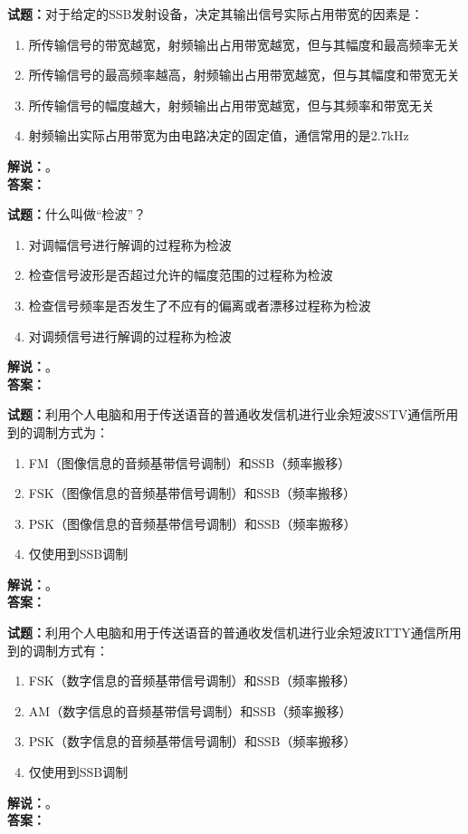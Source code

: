 \documentclass{ctexbook}
\begin{document}
\bigskip

\noindent\textbf{试题：}对于给定的SSB发射设备，决定其输出信号实际占用带宽的因素是：
\begin{enumerate}[leftmargin=3em]
  \item 所传输信号的带宽越宽，射频输出占用带宽越宽，但与其幅度和最高频率无关
  \item 所传输信号的最高频率越高，射频输出占用带宽越宽，但与其幅度和带宽无关
  \item 所传输信号的幅度越大，射频输出占用带宽越宽，但与其频率和带宽无关
  \item 射频输出实际占用带宽为由电路决定的固定值，通信常用的是2.7\unit{\kHz}
\end{enumerate}
\noindent\textbf{解说：}\textbf{}。\\\noindent\textbf{答案：}

\bigskip

\noindent\textbf{试题：}什么叫做“检波”？
\begin{enumerate}[leftmargin=3em]
  \item 对调幅信号进行解调的过程称为检波
  \item 检查信号波形是否超过允许的幅度范围的过程称为检波
  \item 检查信号频率是否发生了不应有的偏离或者漂移过程称为检波
  \item 对调频信号进行解调的过程称为检波
\end{enumerate}
\noindent\textbf{解说：}\textbf{}。\\\noindent\textbf{答案：}

\bigskip

\noindent\textbf{试题：}利用个人电脑和用于传送语音的普通收发信机进行业余短波SSTV通信所用到的调制方式为：
\begin{enumerate}[leftmargin=3em]
  \item FM（图像信息的音频基带信号调制）和SSB（频率搬移）
  \item FSK（图像信息的音频基带信号调制）和SSB（频率搬移）
  \item PSK（图像信息的音频基带信号调制）和SSB（频率搬移）
  \item 仅使用到SSB调制
\end{enumerate}
\noindent\textbf{解说：}\textbf{}。\\\noindent\textbf{答案：}

\bigskip

\noindent\textbf{试题：}利用个人电脑和用于传送语音的普通收发信机进行业余短波RTTY通信所用到的调制方式有：
\begin{enumerate}[leftmargin=3em]
  \item FSK（数字信息的音频基带信号调制）和SSB（频率搬移）
  \item AM（数字信息的音频基带信号调制）和SSB（频率搬移）
  \item PSK（数字信息的音频基带信号调制）和SSB（频率搬移）
  \item 仅使用到SSB调制
\end{enumerate}
\noindent\textbf{解说：}\textbf{}。\\\noindent\textbf{答案：}
\end{document}
